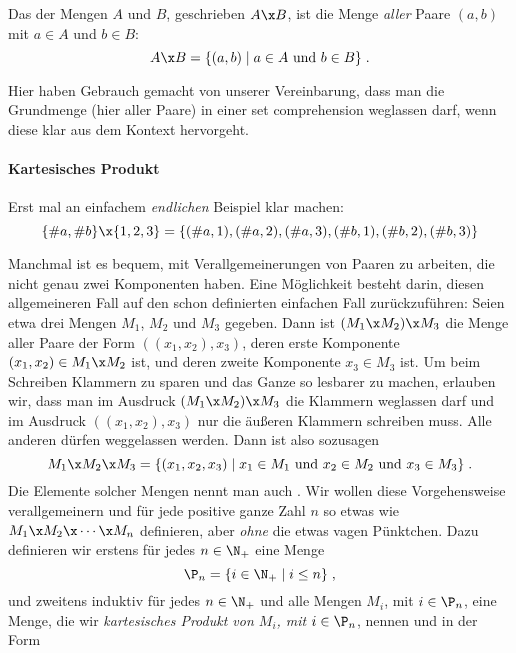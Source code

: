\begin{samepage}
Das  der
Mengen $A$
und $B$,
geschrieben $A\x B$,
ist die Menge \emph{aller} Paare $(a,b)$
mit $a\in A$ und $b\in B$: %
\[
  A\x B = \{ (a,b) \mid a\in A \text{ und } b\in B \} \;.
\]
\end{samepage}
%
Hier haben Gebrauch gemacht von unserer Vereinbarung, dass man die
Grundmenge (hier aller Paare) in einer set comprehension weglassen
darf, wenn diese klar aus dem Kontext hervorgeht.
%
\begin{tutorium}
  \paragraph{Kartesisches Produkt}
  Erst mal an einfachem \emph{endlichen} Beispiel klar machen:
  \[
  \{\#a,\#b\}\x \{1,2,3\}
  = \{(\#a,1), (\#a,2), (\#a,3), (\#b,1), (\#b,2), (\#b,3) \}
  \]
\end{tutorium}
%
Manchmal ist es bequem, mit Verallgemeinerungen von Paaren zu
arbeiten, die nicht genau zwei Komponenten haben.
%
Eine Möglichkeit besteht darin, diesen allgemeineren Fall auf den
schon definierten einfachen Fall zurückzuführen:
%
Seien etwa drei Mengen $M_1$, $M_2$ und $M_3$ gegeben.
%
Dann ist $(M_1\x M_2)\x M_3$
die Menge aller Paare der Form $((x_1, x_2), x_3)$,
deren erste Komponente $(x_1, x_2)\in M_1\x M_2$
ist, und deren zweite Komponente $x_3\in M_3$ ist.
%
Um beim Schreiben Klammern zu sparen und das Ganze so lesbarer zu
machen, erlauben wir, dass man im Ausdruck $(M_1\x M_2)\x M_3$ die
Klammern weglassen darf und im Ausdruck $((x_1, x_2), x_3)$ nur die
äußeren Klammern schreiben muss.
%
Alle anderen dürfen weggelassen werden.
%
Dann ist also sozusagen
\[
  M_1\x M_2\x M_3 = \{ (x_1, x_2,x_3) \mid x_1\in M_1 \text{ und } x_2\in M_2 \text{ und } x_3\in M_3 \} \;.
\]
%
Die Elemente solcher Mengen nennt man auch .
%
Wir wollen diese Vorgehensweise verallgemeinern und für jede positive ganze
Zahl $n$ so etwas wie $M_1\x M_2\x \cdots \x M_n$ definieren, aber \emph{ohne} die etwas vagen Pünktchen.
%
Dazu definieren wir erstens für jedes $n\in\N_+$ eine Menge
\[
  \P_n = \{ i \in \N_+ \mid i \leq n \} \;,
\]
und zweitens induktiv für jedes $n\in\N_+$
und alle Mengen $M_i$,
mit $i\in\P_n$,
eine Menge, die wir \emph{kartesisches Produkt von $M_i$,
  mit $i\in\P_n$}, nennen und in der Form
